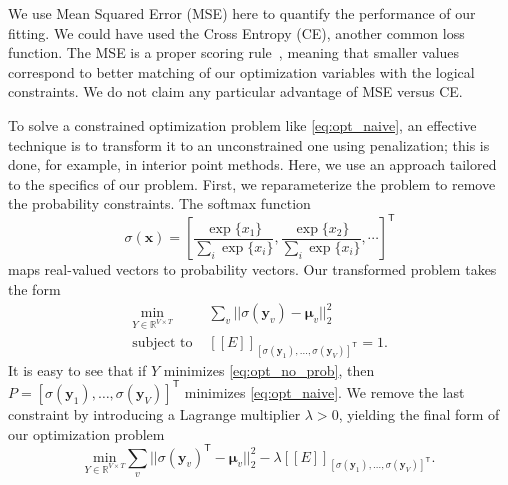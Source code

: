 \documentclass[sigplan,10pt,review,anonymous]{acmart} %
\newcommand{\qqpi}[2]{[\![#2]\!]_{#1}}
\theoremstyle{plain}
\theoremstyle{remark}
\theoremstyle{definition}
\begin{document}
We use Mean Squared Error (MSE) here to quantify the performance of our fitting.
We could have used the Cross Entropy (CE), another common loss function.  The
MSE is a proper scoring rule~\cite{gneiting07}, meaning that smaller values
correspond to better matching of our optimization variables with the logical
constraints.  We do not claim any particular advantage of MSE versus CE.

To solve a constrained optimization problem like \autoref{eq:opt_naive}, an effective technique is to transform it to an unconstrained one using penalization; this is done, for example, in interior point methods.
Here, we use an approach tailored to the specifics of our problem.
First, we reparameterize the problem to remove the probability constraints.
The softmax function
\begin{equation}\label{eq:softmax}
	\sigma(\bm{x}) = \left[\frac{\exp\{x_1\}}{\sum_i \exp\{x_i\}}, \frac{\exp\{x_2\}}{\sum_i \exp\{x_i\}}, \cdots \right]^\mathsf{T}
\end{equation}
maps real-valued vectors to probability vectors.
Our transformed problem takes the form
\begin{equation}
	\begin{aligned}\label{eq:opt_no_prob}
		\underset{Y \in \mathbb{R}^{V \times T}}{\mathrm{min}} &
		\sum_v || \sigma(\bm{y}_v) - \bm{\mu}_v ||_2^2                                                                         \\
		\text{subject to }                                     & \qqpi{[\sigma(\bm{y}_1), \ldots, \sigma(\bm{y}_{V})]^\mathsf{T}}{E} = 1.
	\end{aligned}
\end{equation}
It is easy to see that if $Y$ minimizes \eqref{eq:opt_no_prob}, then
$P = [\sigma(\bm{y}_1), \ldots, \allowbreak \sigma(\bm{y}_{V})]^\mathsf{T}$
minimizes \eqref{eq:opt_naive}.
% 
We remove the last constraint by introducing a Lagrange multiplier $\lambda > 0$, yielding the final form of our optimization problem
\begin{equation}\label{eq:objective}
	\underset{Y \in \mathbb{R}^{V \times T}}{\mathrm{min}}
	\sum_v || \sigma(\bm{y}_v)^\mathsf{T} - \bm{\mu}_v ||_2^2
	- \lambda \qqpi{[\sigma(\bm{y}_1), \ldots, \sigma(\bm{y}_{V})]^\mathsf{T}}{E}.
\end{equation}
\end{document}

